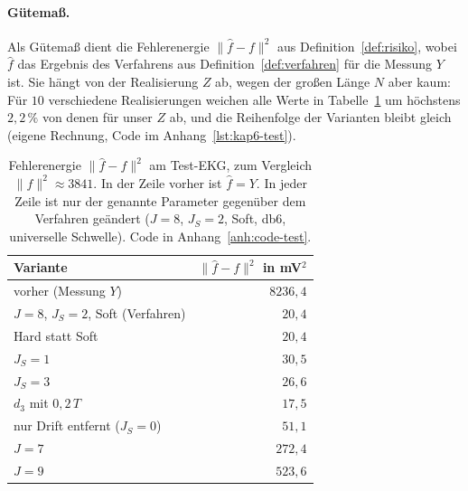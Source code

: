 \documentclass[a4paper,11pt,bibliography=totoc,listof=totoc,headinclude=true,cleardoublepage=empty,oneside]{scrbook}
\theoremstyle{plain}
\theoremstyle{definition}
\newcommand{\norm}[1]{\lVert #1 \rVert}
\begin{document}
\paragraph{Gütema\ss.}
Als Gütema\ss{} dient die Fehlerenergie $\norm{\hat f - f}^2$ aus
Definition~\ref{def:risiko}, wobei $\hat f$ das Ergebnis des Verfahrens aus
Definition~\ref{def:verfahren} für die Messung $Y$ ist. Sie hängt von der
Realisierung $Z$ ab, wegen der gro\ss en Länge $N$ aber kaum: Für $10$
verschiedene Realisierungen weichen alle Werte in Tabelle~\ref{tab:test}
um höchstens $2{,}2\,\%$ von denen für unser $Z$ ab, und die Reihenfolge der
Varianten bleibt gleich (eigene Rechnung, Code im Anhang~\ref{lst:kap6-test}).

\begin{table}[htbp]
  \centering
  \small
  \begin{tabular}{@{}lr@{}}
    \toprule
    Variante & $\norm{\hat f - f}^2$ in mV$^2$ \\
    \midrule
    vorher (Messung $Y$)                 & $8236{,}4$ \\
    $J = 8$, $J_S = 2$, Soft (Verfahren) & $20{,}4$ \\
    Hard statt Soft                      & $20{,}4$ \\
    $J_S = 1$                            & $30{,}5$ \\
    $J_S = 3$                            & $26{,}6$ \\
    $d_3$ mit $0{,}2\,T$                 & $17{,}5$ \\
    nur Drift entfernt ($J_S = 0$)       & $51{,}1$ \\
    $J = 7$                              & $272{,}4$ \\
    $J = 9$                              & $523{,}6$ \\
    \bottomrule
  \end{tabular}
  \caption[Fehlerenergie am Test-EKG]{Fehlerenergie $\norm{\hat f - f}^2$
  am Test-EKG, zum Vergleich $\norm{f}^2 \approx 3841$. In der Zeile
  \glqq vorher\grqq{} ist $\hat f = Y$. In jeder Zeile ist nur der genannte
  Parameter gegenüber dem Verfahren geändert ($J = 8$, $J_S = 2$, Soft, db6,
  universelle Schwelle). Code in Anhang~\ref{anh:code-test}.}
  \label{tab:test}
\end{table}
\end{document}
